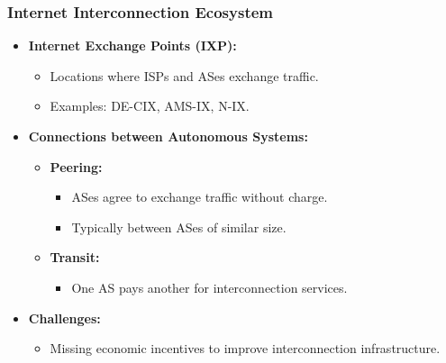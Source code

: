 \subsubsection{Internet Interconnection Ecosystem}
\begin{itemize}
    \item \textbf{Internet Exchange Points (IXP):}
    \begin{itemize}
        \item Locations where ISPs and ASes exchange traffic.
        \item Examples: DE-CIX, AMS-IX, N-IX.
    \end{itemize}
    \item \textbf{Connections between Autonomous Systems:}
    \begin{itemize}
        \item \textbf{Peering:}
        \begin{itemize}
            \item ASes agree to exchange traffic without charge.
            \item Typically between ASes of similar size.
        \end{itemize}
        \item \textbf{Transit:}
        \begin{itemize}
            \item One AS pays another for interconnection services.
        \end{itemize}
    \end{itemize}
    \item \textbf{Challenges:}
    \begin{itemize}
        \item Missing economic incentives to improve interconnection infrastructure.
    \end{itemize}
\end{itemize}

